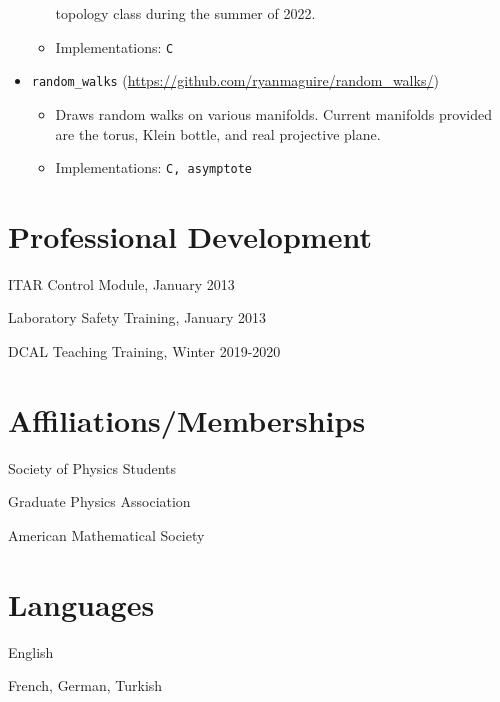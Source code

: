 \documentclass[a4paper,sans]{moderncv}
\begin{document}
\begin{itemize}
\begin{itemize}
                        topology class during the summer of 2022.
                    \item
                        Implementations: \texttt{C}
                \end{itemize}
            \item
                \texttt{random\_walks} (\url{https://github.com/ryanmaguire/random_walks/})
                \begin{itemize}
                    \item
                        Draws random walks on various manifolds. Current
                        manifolds provided are the torus, Klein bottle, and
                        real projective plane.
                    \item Implementations: \texttt{C, asymptote}
                \end{itemize}
        \end{itemize}
    \section{Professional Development}
        \begin{itemize}
            \begin{multicols}{2}
                \item ITAR Control Module, January 2013
                \item Laboratory Safety Training, January 2013
                \item DCAL Teaching Training, Winter 2019-2020
            \end{multicols}
        \end{itemize}
    \section{Affiliations/Memberships}
        \begin{itemize}
            \begin{multicols}{2}
                \item Society of Physics Students
                \item Graduate Physics Association
                \item American Mathematical Society
            \end{multicols}
        \end{itemize}
    \section{Languages}
         English\par
         French, German, Turkish
\end{document}
